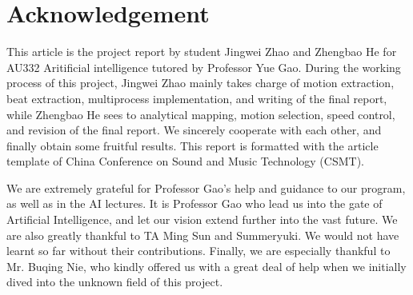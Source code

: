 \documentclass[UTF8,a4paper]{article}
\begin{document}
	\section*{Acknowledgement}
	\noindent This article is the project report by student Jingwei Zhao and Zhengbao He for AU332 Aritificial intelligence tutored by Professor Yue Gao. During the working process of this project, Jingwei Zhao mainly takes charge of motion extraction, beat extraction, multiprocess implementation, and writing of the final report, while Zhengbao He sees to analytical mapping, motion selection, speed control, and revision of the final report. We sincerely cooperate with each other, and finally obtain some fruitful results. This report is formatted with the article template of China Conference on Sound and Music Technology (CSMT).

	We are extremely grateful for Professor Gao's help and guidance to our program, as well as in the AI lectures. It is Professor Gao who lead us into the gate of Artificial Intelligence, and let our vision extend further into the vast future. We are also greatly thankful to TA Ming Sun and Summeryuki. We would not have learnt so far without their contributions. Finally, we are especially thankful to Mr. Buqing Nie, who kindly offered us with a great deal of help when we initially dived into the unknown field of this project.
	


	
	
	
\end{document}
